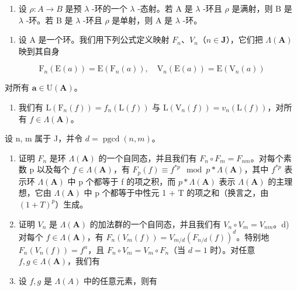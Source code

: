 \begin{enumerate}
\def\labelenumi{\alph{enumi})}
\setcounter{enumi}{5}
\tightlist
\item
  设 \(\rho: A \to B\) 是预 \(\lambda\) -环的一个 \(\lambda\) -态射。若 A 是 \(\lambda\) -环且 \(\rho\) 是满射，则 B 是 \(\lambda\) -环。若 B 是 \(\lambda\) -环且 \(\rho\) 是单射，则 A 是 \(\lambda\) -环。
\end{enumerate}

\begin{enumerate}
\def\labelenumi{\arabic{enumi})}
\setcounter{enumi}{46}
\tightlist
\item
  设 A 是一个环。我们用下列公式定义映射 \(F_{n}\)、\(V_{n}\)（\(n \in \mathbf{J}\)），它们把 \(\Lambda(\mathbf{A})\) 映到其自身
\end{enumerate}

\[
\mathrm{F} _ {n} (\mathrm{E} (a)) = \mathrm{E} \left(\mathrm{F} _ {n} (a)\right), \quad \mathrm{V} _ {n} (\mathrm{E} (a)) = \mathrm{E} \left(\mathrm{V} _ {n} (a)\right)
\]

对所有 \(\boldsymbol{a} \in \mathrm{U}(\mathbf{A})\)。

\begin{enumerate}
\def\labelenumi{\alph{enumi})}
\tightlist
\item
  我们有 \(\mathrm{L}(\mathrm{F}_n(f)) = f_n(\mathrm{L}(f))\) 与 \(\mathrm{L}(\mathrm{V}_n(f)) = v_n(\mathrm{L}(f))\)，对所有 \(f \in \Lambda(\mathbf{A})\)。
\end{enumerate}

设 n, m 属于 J，并令 \(d = \operatorname{pgcd}(n, m)\)。

\begin{enumerate}
\def\labelenumi{\alph{enumi})}
\setcounter{enumi}{1}
\item
  证明 \(F_{n}\) 是环 \(\Lambda(\mathbf{A})\) 的一个自同态，并且我们有 \(F_{n} \circ F_{m} = F_{nm}\)。对每个素数 p 以及每个 \(f \in \Lambda(\mathbf{A})\)，有 \(F_{p}(f) \equiv f^{*p} \mod p * \Lambda(\mathbf{A})\)，其中 \(f^{*p}\) 表示环 \(\Lambda(\mathbf{A})\) 中 p 个都等于 f 的项之积，而 \(p * \Lambda(\mathbf{A})\) 表示 \(\Lambda(\mathbf{A})\) 的主理想，它由 \(\Lambda(\mathbf{A})\) 中 p 个都等于中性元 1 + T 的项之和（换言之，由 \((1 + T)^{p}\)）生成。
\item
  证明 \(V_{n}\) 是 \(\Lambda(\mathbf{A})\) 的加法群的一个自同态，并且我们有 \(V_{n} \circ V_{m} = V_{nm}\)。d) 对每个 \(f \in \Lambda(\mathbf{A})\)，有 \(F_{n}(V_{m}(f)) = V_{m/d}(F_{n/d}(f))^{d}\)。特别地 \(F_{n}(V_{n}(f)) = f^{n}\)，且 \(F_{n} \circ V_{m} = V_{m} \circ F_{n}\)（当 \(d = 1\) 时）。对任意 \(f,g\in\Lambda(\mathbf{A})\)，我们有
\item
  设 \(f, g\) 是 \(\Lambda(A)\) 中的任意元素，则有
\end{enumerate}

